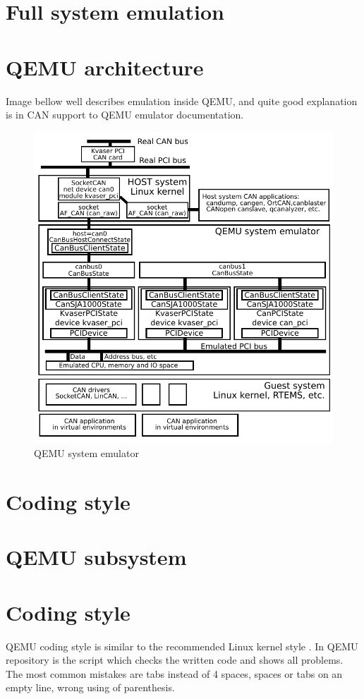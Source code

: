 \documentclass{ctuthesis}
\begin{document}
 \section{Full system emulation}

 \section{QEMU architecture}
  Image bellow well describes emulation inside QEMU, and quite good explanation is in CAN support to QEMU emulator documentation. \cite[page 2-4]{qemu-mainline}
  \begin{figure}[H]
  \includegraphics[width=1\textwidth]{qemu-can-bus}
  \caption{QEMU system emulator \cite{qemu-canbusexplain}}
  \end{figure}
  \section{Coding style}
 
 \section{QEMU subsystem}

 \section{Coding style}
  QEMU coding style \cite{qemu-style} is similar to the recommended Linux kernel style \cite{linux-style}. In QEMU repository is the script which checks the written code and shows all problems. The most common mistakes are tabs instead of 4 spaces, spaces or tabs on an empty line, wrong using of parenthesis.
 
\end{document}
